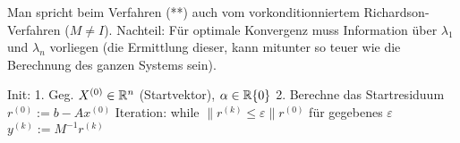  \begin{bemerkung}
 Man spricht beim Verfahren (**) auch vom vorkonditionniertem Richardson-Verfahren ($M\neq I$). 
 Nachteil: Für optimale Konvergenz muss Information über $\lambda_1$ und $\lambda_n$ vorliegen (die Ermittlung dieser, kann mitunter so teuer wie die Berechnung des ganzen Systems sein).
 \end{bemerkung}

 \begin{algorithmus}
   Init: 1. Geg. $X^{(0)}\in \mathbb{R}^n$ (Startvektor), $\alpha\in\mathbb{R} \\ \{0\}$
   2. Berechne das Startresiduum $r^{(0)} := b-Ax^{(0)}$
   Iteration: while $\|r^{(k)} \leq \varepsilon \|r^{(0)}$ für gegebenes $\varepsilon$\\
   $y^{(k)} := M^{-1} r^{(k)}$\\
 \end{algorithmus}

